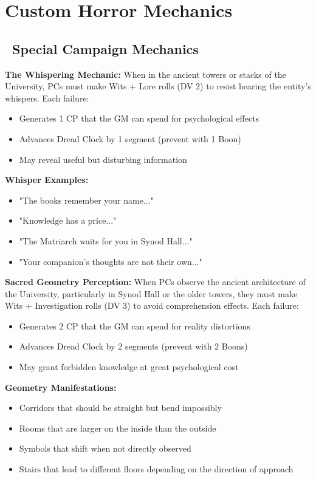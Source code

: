 \documentclass[11pt]{article}
\begin{document}
\section{Custom Horror Mechanics}

\subsection*{\faSkull\ Special Campaign Mechanics}

\textbf{The Whispering Mechanic:}
When in the ancient towers or stacks of the University, PCs must make Wits + Lore rolls (DV 2) to resist hearing the entity's whispers. Each failure:
\begin{itemize}
    \item Generates 1 CP that the GM can spend for psychological effects
    \item Advances Dread Clock by 1 segment (prevent with 1 Boon)
    \item May reveal useful but disturbing information
\end{itemize}

\textbf{Whisper Examples:}
\begin{itemize}
    \item "The books remember your name..."
    \item "Knowledge has a price..."
    \item "The Matriarch waits for you in Synod Hall..."
    \item "Your companion's thoughts are not their own..."
\end{itemize}

\textbf{Sacred Geometry Perception:}
When PCs observe the ancient architecture of the University, particularly in Synod Hall or the older towers, they must make Wits + Investigation rolls (DV 3) to avoid comprehension effects. Each failure:
\begin{itemize}
    \item Generates 2 CP that the GM can spend for reality distortions
    \item Advances Dread Clock by 2 segments (prevent with 2 Boons)
    \item May grant forbidden knowledge at great psychological cost
\end{itemize}

\textbf{Geometry Manifestations:}
\begin{itemize}
    \item Corridors that should be straight but bend impossibly
    \item Rooms that are larger on the inside than the outside
    \item Symbols that shift when not directly observed
    \item Stairs that lead to different floors depending on the direction of approach
\end{itemize}
\end{document}
